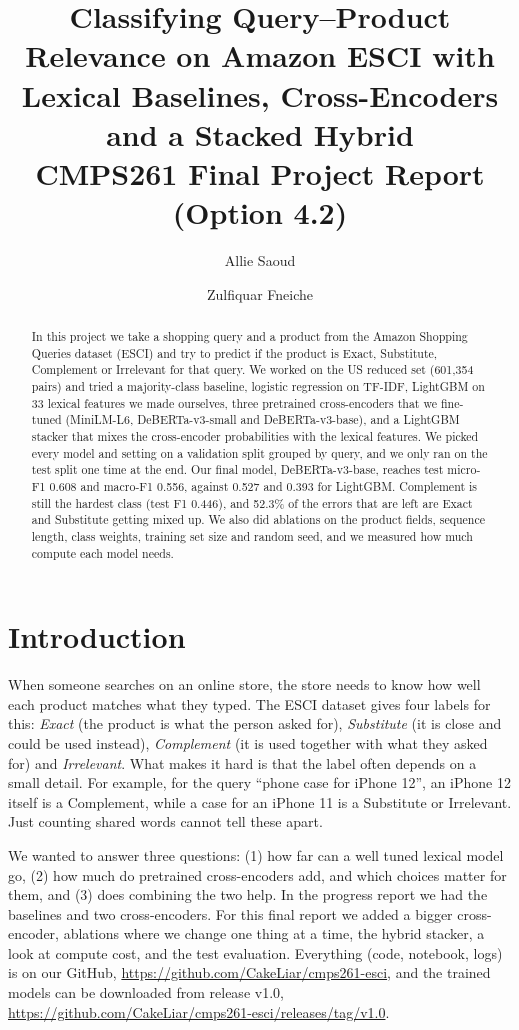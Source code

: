 \documentclass[11pt]{article}
\title{Classifying Query--Product Relevance on Amazon ESCI with Lexical Baselines, Cross-Encoders and a Stacked Hybrid\\[4pt]\large CMPS261 Final Project Report (Option 4.2)}
\author{Allie Saoud \and Zulfiquar Fneiche}
\date{}
\begin{document}
\maketitle

\begin{abstract}
In this project we take a shopping query and a product from the Amazon Shopping Queries dataset (ESCI) and try to predict if the product is Exact, Substitute, Complement or Irrelevant for that query.
We worked on the US reduced set (601{,}354 pairs) and tried a majority-class baseline, logistic regression on TF-IDF, LightGBM on 33 lexical features we made ourselves, three pretrained cross-encoders that we fine-tuned (MiniLM-L6, DeBERTa-v3-small and DeBERTa-v3-base), and a LightGBM stacker that mixes the cross-encoder probabilities with the lexical features.
We picked every model and setting on a validation split grouped by query, and we only ran on the test split one time at the end.
Our final model, DeBERTa-v3-base, reaches test micro-F1 0.608 and macro-F1 0.556, against 0.527 and 0.393 for LightGBM.
Complement is still the hardest class (test F1 0.446), and 52.3\% of the errors that are left are Exact and Substitute getting mixed up.
We also did ablations on the product fields, sequence length, class weights, training set size and random seed, and we measured how much compute each model needs.
\end{abstract}

\section{Introduction}
When someone searches on an online store, the store needs to know how well each product matches what they typed.
The ESCI dataset \cite{reddy2022} gives four labels for this: \emph{Exact} (the product is what the person asked for), \emph{Substitute} (it is close and could be used instead), \emph{Complement} (it is used together with what they asked for) and \emph{Irrelevant}.
What makes it hard is that the label often depends on a small detail. For example, for the query ``phone case for iPhone 12'', an iPhone 12 itself is a Complement, while a case for an iPhone 11 is a Substitute or Irrelevant.
Just counting shared words cannot tell these apart.

We wanted to answer three questions: (1) how far can a well tuned lexical model go, (2) how much do pretrained cross-encoders add, and which choices matter for them, and (3) does combining the two help.
In the progress report we had the baselines and two cross-encoders. For this final report we added a bigger cross-encoder, ablations where we change one thing at a time, the hybrid stacker, a look at compute cost, and the test evaluation.
Everything (code, notebook, logs) is on our GitHub, \url{https://github.com/CakeLiar/cmps261-esci}, and the trained models can be downloaded from release v1.0, \url{https://github.com/CakeLiar/cmps261-esci/releases/tag/v1.0}.
\end{document}
